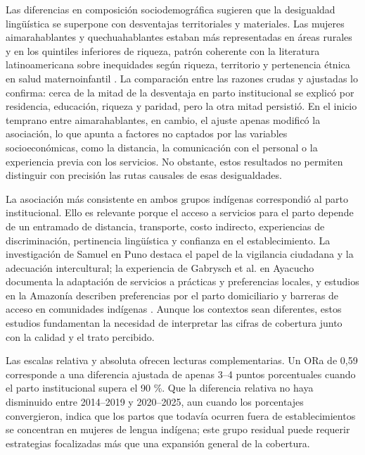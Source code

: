 \documentclass[
  spanish,
  letterpaper,
  conference]{IEEEtran}
\begin{document}
Las diferencias en composición sociodemográfica sugieren que la
desigualdad lingüística se superpone con desventajas territoriales y
materiales. Las mujeres aimarahablantes y quechuahablantes estaban más
representadas en áreas rurales y en los quintiles inferiores de riqueza,
patrón coherente con la literatura latinoamericana sobre inequidades
según riqueza, territorio y pertenencia étnica en salud maternoinfantil
\citep{mesenburg2018, colome2021}. La comparación entre las razones
crudas y ajustadas lo confirma: cerca de la mitad de la desventaja en
parto institucional se explicó por residencia, educación, riqueza y
paridad, pero la otra mitad persistió. En el inicio temprano entre
aimarahablantes, en cambio, el ajuste apenas modificó la asociación, lo
que apunta a factores no captados por las variables socioeconómicas,
como la distancia, la comunicación con el personal o la experiencia
previa con los servicios. No obstante, estos resultados no permiten
distinguir con precisión las rutas causales de esas desigualdades.

La asociación más consistente en ambos grupos indígenas correspondió al
parto institucional. Ello es relevante porque el acceso a servicios para
el parto depende de un entramado de distancia, transporte, costo
indirecto, experiencias de discriminación, pertinencia lingüística y
confianza en el establecimiento. La investigación de Samuel
\citep{samuel2016} en Puno destaca el papel de la vigilancia ciudadana y
la adecuación intercultural; la experiencia de Gabrysch et al.
\citep{gabrysch2009} en Ayacucho documenta la adaptación de servicios a
prácticas y preferencias locales, y estudios en la Amazonía describen
preferencias por el parto domiciliario y barreras de acceso en
comunidades indígenas \citep{delmastro2021, mejia2025}. Aunque los
contextos sean diferentes, estos estudios fundamentan la necesidad de
interpretar las cifras de cobertura junto con la calidad y el trato
percibido.

Las escalas relativa y absoluta ofrecen lecturas complementarias. Un ORa
de 0,59 corresponde a una diferencia ajustada de apenas 3--4 puntos
porcentuales cuando el parto institucional supera el 90 \%. Que la
diferencia relativa no haya disminuido entre 2014--2019 y 2020--2025,
aun cuando los porcentajes convergieron, indica que los partos que
todavía ocurren fuera de establecimientos se concentran en mujeres de
lengua indígena; este grupo residual puede requerir estrategias
focalizadas más que una expansión general de la cobertura.
\end{document}
